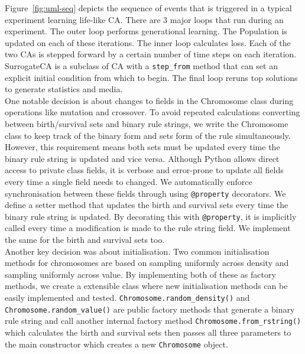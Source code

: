 Figure~\ref{fig:uml-seq} depicts the sequence of events that is triggered in a typical experiment learning life-like CA. There are 3 major loops that run during an experiment. The outer loop performs generational learning. The Population is updated on each of these iterations. The inner loop calculates loss. Each of the two CAs is stepped forward by a certain number of time steps on each iteration. SurrogateCA is a subclass of CA with a \texttt{step\_from} method that can set an explicit initial condition from which to begin. The final loop reruns top solutions to generate statistics and media.\\

One notable decision is about changes to fields in the Chromosome class during operations like mutation and crossover. To avoid repeated calculations converting between birth/survival sets and binary rule strings, we write the Chromosome class to keep track of the binary form and sets form of the rule simultaneously. However, this requirement means both sets must be updated every time the binary rule string is updated and vice versa. Although Python allows direct access to private class fields, it is verbose and error-prone to update all fields every time a single field needs to changed. We automatically enforce synchronisation between these fields through using \texttt{@property} decorators. We define a setter method that updates the birth and survival sets every time the binary rule string is updated. By decorating this with \texttt{@property}, it is implicitly called every time a modification is made to the rule string field. We implement the same for the birth and survival sets too.\\

Another key decision was about initialisation. Two common initialisation methods for chromosomes are based on sampling uniformly across density and sampling uniformly across value. By implementing both of these as factory methods, we create a extensible class where new initialisation methods can be easily implemented and tested. \texttt{Chromosome.random\_density()} and \texttt{Chromosome.random\_value()} are public factory methods that generate a binary rule string and call another internal factory method \texttt{Chromosome.from\_rstring()} which calculates the birth and survival sets then passes all three parameters to the main constructor which creates a new \texttt{Chromosome} object.\\

